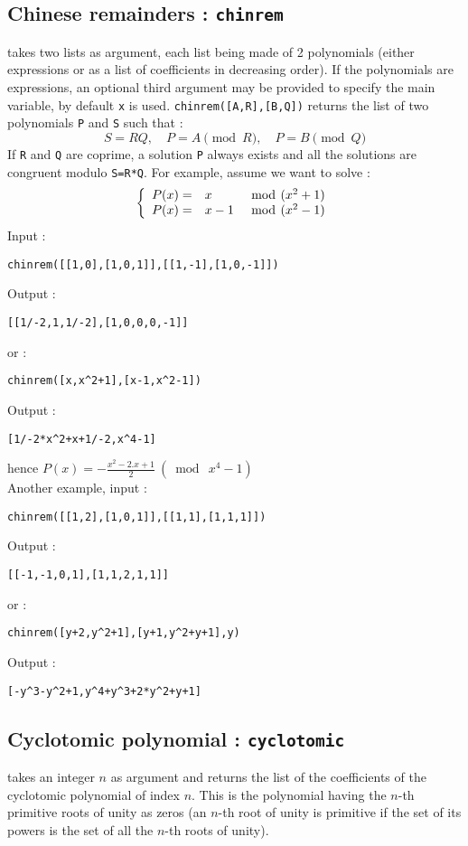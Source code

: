 \documentclass[a4paper,11pt]{book}
\begin{document}
\subsection{Chinese remainders : {\tt chinrem}}
 takes two lists as argument, each list being made of 2  
polynomials (either expressions or as a list of coefficients in decreasing 
order). If the polynomials are expressions, an optional third
argument may be provided to specify the main variable, by default
{\tt x} is used.
{\tt chinrem([A,R],[B,Q])} returns the list of two polynomials
{\tt P} and {\tt S} such that :
\[  S=R Q, \quad  P=A \pmod R, \quad P=B \pmod Q \]
If {\tt R} and {\tt Q} are coprime, a solution {\tt P} always exists 
and all the solutions are congruent modulo {\tt S=R*Q}.
For example, assume we want to solve :
\[ {\tt \left\{ \begin{array}{rlr} P(x)=&x\ &\bmod\ (x^2+1)\\
      P(x)=&x-1\ &\bmod\ (x^2-1) \end{array}\right.} \]
Input :
\begin{center}{\tt chinrem([[1,0],[1,0,1]],[[1,-1],[1,0,-1]])}\end{center}
Output :
\begin{center}{\tt [[1/-2,1,1/-2],[1,0,0,0,-1]]}\end{center}
or :
\begin{center}{\tt chinrem([x,x\verb|^|2+1],[x-1,x\verb|^|2-1])}\end{center}
Output :
\begin{center}{\tt [1/-2*x\verb|^|2+x+1/-2,x\verb|^|4-1]}\end{center}
hence $\displaystyle P(x)=-\frac{x^2-2.x+1}{2} \ (\bmod\  x^4-1)$\\
Another example, input :
\begin{center}{\tt chinrem([[1,2],[1,0,1]],[[1,1],[1,1,1]])}\end{center}
Output :
\begin{center}{\tt [[-1,-1,0,1],[1,1,2,1,1]]}\end{center}
or :
\begin{center}{\tt chinrem([y+2,y\verb|^|2+1],[y+1,y\verb|^|2+y+1],y)}\end{center}
Output :
\begin{center}{\tt [-y\verb|^|3-y\verb|^|2+1,y\verb|^|4+y\verb|^|3+2*y\verb|^|2+y+1]}\end{center}

\subsection{Cyclotomic polynomial : {\tt cyclotomic}}
  takes an integer $n$ as argument and
returns the list of the coefficients of the cyclotomic 
polynomial of index $n$.  This
is the polynomial having the $n$-th primitive roots of unity
as zeros (an $n$-th root of unity is primitive if the set of its 
powers is the set of all the $n$-th roots of unity).
\end{document}
